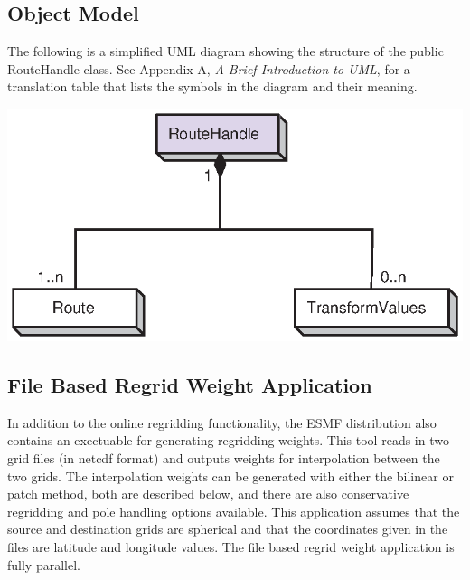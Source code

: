 \subsection{Object Model}

The following is a simplified UML diagram showing the structure of the public
RouteHandle class.  See Appendix A, {\it A Brief Introduction to UML}, for a
translation table that lists the symbols in the diagram and their meaning.

\begin{center}
\includegraphics{RouteHandle_obj}
\end{center}


\subsection{File Based Regrid Weight Application}
\label{sec:regrid:offline}

 In addition to the online regridding functionality, the ESMF distribution also 
contains an exectuable for generating regridding weights. This tool reads in
two grid files (in netcdf format) and outputs weights for interpolation 
between the two grids.  The interpolation weights can be generated with either the bilinear
or patch method, both are described below, and there are also conservative regridding 
and pole handling options available.
This application assumes that the source and destination grids
are spherical and that the coordinates given in the files are latitude and longitude
values. The file based regrid weight application is fully parallel.

